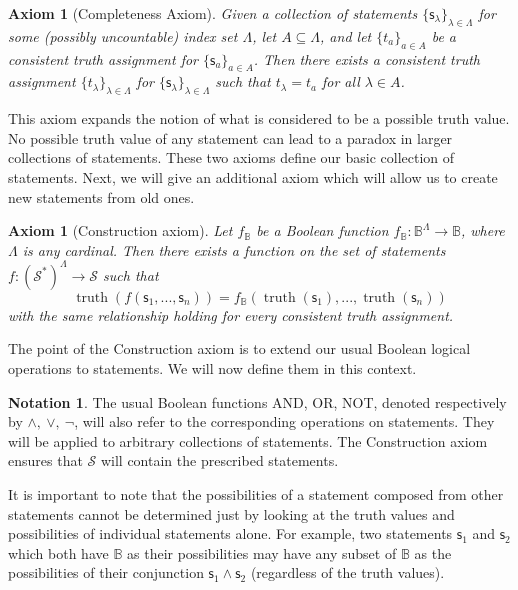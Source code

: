 \documentclass[psamsfonts]{amsart}
\newtheorem{axiom}[thm]{Axiom}
\theoremstyle{definition}
\newtheorem{notn}[thm]{Notation}
\theoremstyle{remark}
\numberwithin{equation}{section}
\DeclareMathOperator{\truth}{truth}
\def\AND{\wedge}
\def\OR{\vee}
\def\NOT{\neg}
\newcommand{\stmt}[1][s] {\mathsf{#1}}
\begin{document}
\begin{axiom}[Completeness Axiom]
\label{completeness}
Given a collection of statements $\{\stmt_{\lambda}\}_{\lambda\in\Lambda}$ for some (possibly uncountable) index set $\Lambda$, let $A\subseteq\Lambda$, and let $\{t_a\}_{a\in A}$ be a consistent truth assignment for $\{\stmt_a\}_{a\in A}$. Then there exists a consistent truth assignment $\{t_{\lambda}\}_{\lambda\in\Lambda}$ for $\{\stmt_{\lambda}\}_{\lambda\in\Lambda}$ such that $t_{\lambda} = t_a$ for all $\lambda\in A$. 
\end{axiom}
This axiom expands the notion of what is considered to be a possible truth value. No possible truth value of any statement can lead to a paradox in larger collections of statements. These two axioms define our basic collection of statements. Next, we will give an additional axiom which will allow us to create new statements from old ones. 

\begin{axiom}[Construction axiom]
Let $f_{\mathbb{B}}$ be a Boolean function $f_{\mathbb{B}}:\mathbb{B}^{\Lambda}\to\mathbb{B}$, where $\Lambda$ is any cardinal. Then there exists a function on the set of statements $f:(\mathcal{S}^*)^{\Lambda}\to\mathcal{S}$ such that
		$$\truth(f(\stmt_1, ..., \stmt_n)) = f_{\mathbb{B}}(\truth(\stmt_1), ..., \truth(\stmt_n))$$
with the same relationship holding for every consistent truth assignment. 
\end{axiom}

The point of the Construction axiom is to extend our usual Boolean logical operations to statements. We will now define them in this context.

\begin{notn}
The usual Boolean functions AND, OR, NOT, denoted respectively by $\AND,\ \OR,\ \NOT$, will also refer to the corresponding operations on statements. They will be applied to arbitrary collections of statements. The Construction axiom ensures that $\mathcal{S}$ will contain the prescribed statements. 
\end{notn}

It is important to note that the possibilities of a statement composed from other statements cannot be determined just by looking at the truth values and possibilities of individual statements alone. For example, two statements $\stmt_1$ and $\stmt_2$ which both have $\mathbb{B}$ as their possibilities may have any subset of $\mathbb{B}$ as the possibilities of their conjunction $\stmt_1\AND\stmt_2$ (regardless of the truth values). 
\end{document}
